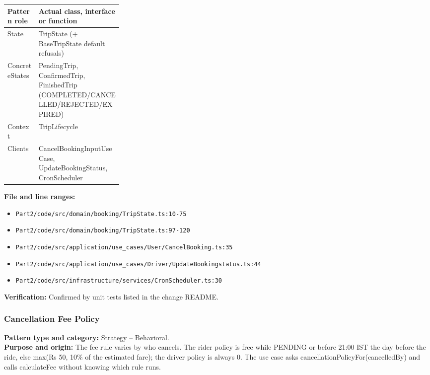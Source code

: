 \documentclass[11pt,a4paper]{article}
\begin{document}
\noindent\begin{tabularx}{\linewidth}{@{}P{0.27\linewidth}Y@{}}
\toprule Pattern role & Actual class, interface or function \\ \midrule
State & TripState (+ BaseTripState default refusals) \\
ConcreteStates & PendingTrip, ConfirmedTrip, FinishedTrip (COMPLETED/CANCELLED/REJECTED/EXPIRED) \\
Context & TripLifecycle \\
Clients & CancelBookingInputUseCase, UpdateBookingStatus, CronScheduler \\
\bottomrule
\end{tabularx}

\noindent\textbf{File and line ranges:}\begin{itemize}\setlength\itemsep{0pt}\item \texttt{Part2/\allowbreak{}code/\allowbreak{}src/\allowbreak{}domain/\allowbreak{}booking/\allowbreak{}TripState.\allowbreak{}ts:10-75}\item \texttt{Part2/\allowbreak{}code/\allowbreak{}src/\allowbreak{}domain/\allowbreak{}booking/\allowbreak{}TripState.\allowbreak{}ts:97-120}\item \texttt{Part2/\allowbreak{}code/\allowbreak{}src/\allowbreak{}application/\allowbreak{}use\_\allowbreak{}cases/\allowbreak{}User/\allowbreak{}CancelBooking.\allowbreak{}ts:35}\item \texttt{Part2/\allowbreak{}code/\allowbreak{}src/\allowbreak{}application/\allowbreak{}use\_\allowbreak{}cases/\allowbreak{}Driver/\allowbreak{}UpdateBookingstatus.\allowbreak{}ts:44}\item \texttt{Part2/\allowbreak{}code/\allowbreak{}src/\allowbreak{}infrastructure/\allowbreak{}services/\allowbreak{}CronScheduler.\allowbreak{}ts:30}\end{itemize}
\noindent\textbf{Verification:} Confirmed by unit tests listed in the change README.

\subsubsection*{Cancellation Fee Policy}
\textbf{Pattern type and category:} Strategy -- Behavioral.\\
\textbf{Purpose and origin:} The fee rule varies by who cancels. The rider policy is free while PENDING or before 21:00 IST the day before the ride, else max(Rs 50, 10\% of the estimated fare); the driver policy is always 0. The use case asks cancellationPolicyFor(cancelledBy) and calls calculateFee without knowing which rule runs.
\end{document}
